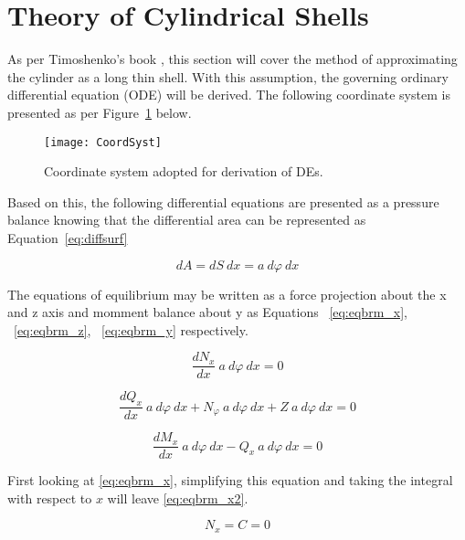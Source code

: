 \section{Theory of Cylindrical Shells}

As per Timoshenko's book \citep{timoshenko1959theory}, this section will cover the method of approximating the cylinder as a long thin shell. With this assumption, the governing ordinary differential equation (ODE) will be derived. The following coordinate system is presented as per Figure~\ref{fig:CoordSyst} below.

\begin{figure}[H]
	\centering
	\texttt{[image: CoordSyst]}
	\caption{Coordinate system adopted for derivation of DEs. \citep{timoshenko1959theory}}
	\label{fig:CoordSyst}
\end{figure}

Based on this, the following differential equations are presented as a pressure balance knowing that the differential area can be represented as Equation~\ref{eq:diffsurf}
 
\begin{equation}
	\label{eq:diffsurf}
	dA = dS\ dx = a\ d\varphi \ dx   
\end{equation}

The equations of equilibrium may be written as a force projection about the x and z axis and momment balance about y as Equations ~\ref{eq:eqbrm_x}, ~\ref{eq:eqbrm_z}, ~\ref{eq:eqbrm_y} respectively.

\begin{equation}
	\label{eq:eqbrm_x}
	\frac{dN_x}{dx}\ a\ d\varphi \ dx = 0
\end{equation}

\begin{equation}
	\label{eq:eqbrm_z}
	\frac{dQ_x}{dx}\ a\ d\varphi \ dx+ N_\varphi \ a\ d\varphi \ dx +Z\ a\ d\varphi \ dx= 0
\end{equation}

\begin{equation}
	\label{eq:eqbrm_y}
	\frac{dM_x}{dx}\ a\ d\varphi \ dx- Q_x\ a\ d\varphi \ dx= 0
\end{equation}

First looking at \ref{eq:eqbrm_x}, simplifying this equation and taking the integral with respect to $x$ will leave \ref{eq:eqbrm_x2}. 

\begin{equation}
	\label{eq:eqbrm_x2}
	N_x = C = 0 
\end{equation}

